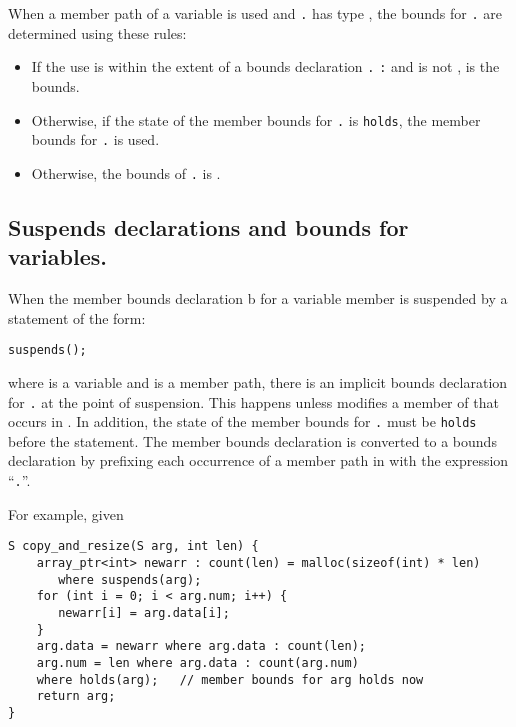 When a member path  of a variable  is used and
\texttt{.} has type \arrayptr, the bounds for
\texttt{.} are determined using these rules:

\begin{itemize}
\item
  If the use is within the extent of a bounds declaration
  \texttt{.} \texttt{:}  and
   is not \boundsunknown,  is
  the bounds.
\item
  Otherwise, if the state of the member bounds for
  \texttt{.} is \texttt{holds}, the member bounds for
  \texttt{.} is used.
\item
  Otherwise, the bounds of \texttt{.} is
  \boundsunknown.
\end{itemize}

\subsection{Suspends declarations and bounds for variables.}

When the member bounds declaration b for a variable member is
suspended by a statement of the form:

  \texttt{suspends(}\texttt{);}

where  is a variable and  is a member path, there is an
implicit bounds declaration for \texttt{.} at the point
of suspension. This happens unless  modifies a member 
of  that occurs in . In addition, the state of the
member bounds for \texttt{.} must be \texttt{holds}
before the statement. The member bounds declaration  is
converted to a bounds declaration by prefixing each occurrence of a
member path in  with the expression ``\texttt{.}''.

For example, given

\begin{lstlisting}
S copy_and_resize(S arg, int len) {
    array_ptr<int> newarr : count(len) = malloc(sizeof(int) * len)
       where suspends(arg);
    for (int i = 0; i < arg.num; i++) {
       newarr[i] = arg.data[i];
    }
    arg.data = newarr where arg.data : count(len);
    arg.num = len where arg.data : count(arg.num)
    where holds(arg);   // member bounds for arg holds now
    return arg;
}
\end{lstlisting}


